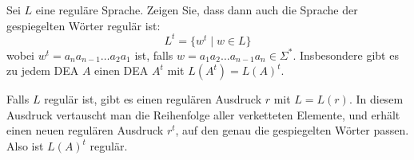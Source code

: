 Sei $L$ eine reguläre Sprache. Zeigen Sie, dass dann auch die Sprache
der gespiegelten Wörter regulär ist:
\[
L^t
=
\{
w^t\mid w\in L
\}
\]
wobei $w^t=a_na_{n-1}\dots a_2a_1$ ist, falls
$w=a_1a_2\dots a_{n-1}a_n\in\Sigma^*$. Insbesondere gibt es zu jedem DEA $A$
einen DEA $A^t$ mit $L(A^t)=L(A)^t$.


\begin{loesung}
Falls $L$ regulär ist, gibt es einen regulären Ausdruck $r$
mit $L=L(r)$. In diesem Ausdruck vertauscht man die Reihenfolge aller
verketteten Elemente, und erhält einen neuen regulären Ausdruck
$r^t$, auf den genau die gespiegelten Wörter passen.
Also ist $L(A)^t$ regulär.
\end{loesung}
